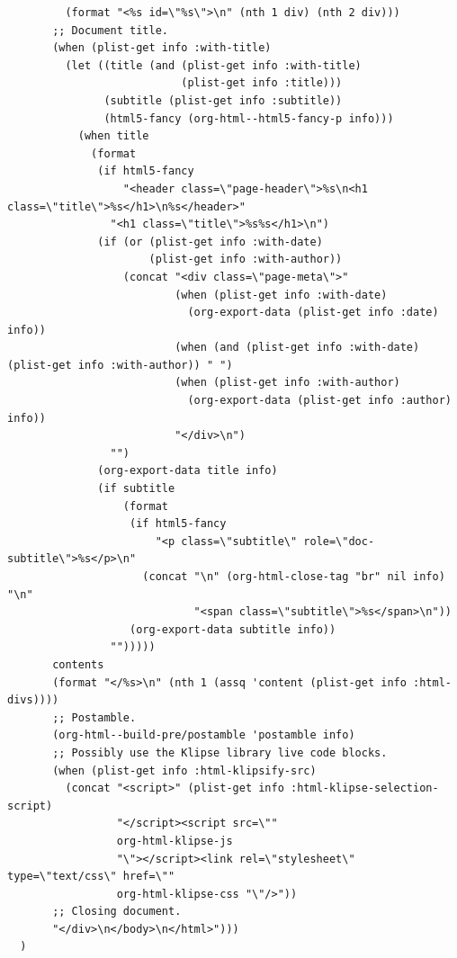 \documentclass[11pt]{article}
\begin{document}
\begin{verbatim}
         (format "<%s id=\"%s\">\n" (nth 1 div) (nth 2 div)))
       ;; Document title.
       (when (plist-get info :with-title)
         (let ((title (and (plist-get info :with-title)
                           (plist-get info :title)))
               (subtitle (plist-get info :subtitle))
               (html5-fancy (org-html--html5-fancy-p info)))
           (when title
             (format
              (if html5-fancy
                  "<header class=\"page-header\">%s\n<h1 class=\"title\">%s</h1>\n%s</header>"
                "<h1 class=\"title\">%s%s</h1>\n")
              (if (or (plist-get info :with-date)
                      (plist-get info :with-author))
                  (concat "<div class=\"page-meta\">"
                          (when (plist-get info :with-date)
                            (org-export-data (plist-get info :date) info))
                          (when (and (plist-get info :with-date) (plist-get info :with-author)) " ")
                          (when (plist-get info :with-author)
                            (org-export-data (plist-get info :author) info))
                          "</div>\n")
                "")
              (org-export-data title info)
              (if subtitle
                  (format
                   (if html5-fancy
                       "<p class=\"subtitle\" role=\"doc-subtitle\">%s</p>\n"
                     (concat "\n" (org-html-close-tag "br" nil info) "\n"
                             "<span class=\"subtitle\">%s</span>\n"))
                   (org-export-data subtitle info))
                "")))))
       contents
       (format "</%s>\n" (nth 1 (assq 'content (plist-get info :html-divs))))
       ;; Postamble.
       (org-html--build-pre/postamble 'postamble info)
       ;; Possibly use the Klipse library live code blocks.
       (when (plist-get info :html-klipsify-src)
         (concat "<script>" (plist-get info :html-klipse-selection-script)
                 "</script><script src=\""
                 org-html-klipse-js
                 "\"></script><link rel=\"stylesheet\" type=\"text/css\" href=\""
                 org-html-klipse-css "\"/>"))
       ;; Closing document.
       "</div>\n</body>\n</html>")))
  )
\end{verbatim}
\end{document}
